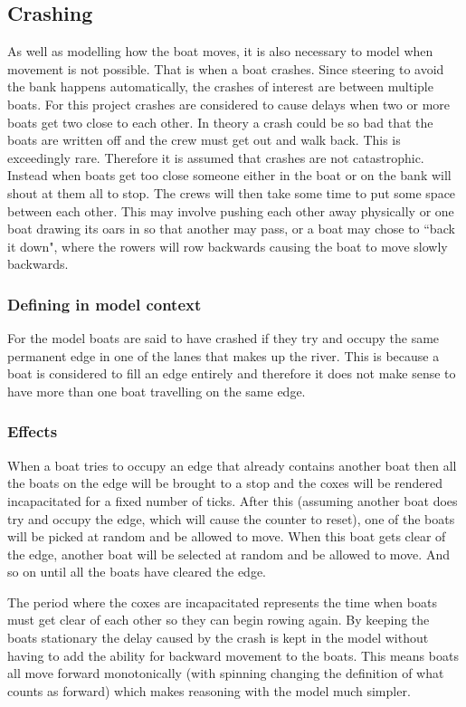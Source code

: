       \subsection{Crashing}\label{model:movement:crashing}
      As well as modelling how the boat moves, it is also necessary to model when movement is not possible. That is when a boat crashes. Since steering to avoid the bank happens automatically, the crashes of interest are between multiple boats. For this project crashes are considered to cause delays when two or more boats get two close to each other. In theory a crash could be so bad that the boats are written off and the crew must get out and walk back. This is exceedingly rare. Therefore it is assumed that crashes are not catastrophic. Instead when boats get too close someone either in the boat or on the bank will shout at them all to stop. The crews will then take some time to put some space between each other. This may involve pushing each other away physically or one boat drawing its oars in so that another may pass, or a boat may chose to ``back it down", where the rowers will row backwards causing the boat to move slowly backwards.
        
      \subsubsection{Defining in model context}
      For the model boats are said to have crashed if they try and occupy the same permanent edge in one of the lanes that makes up the river. This is because a boat is considered to fill an edge entirely and therefore it does not make sense to have more than one boat travelling on the same edge.

      \subsubsection{Effects}
      When a boat tries to occupy an edge that already contains another boat then all the boats on the edge will be brought to a stop and the coxes will be rendered incapacitated for a fixed number of ticks. After this (assuming another boat does try and occupy the edge, which will cause the counter to reset), one of the boats will be picked at random and be allowed to move. When this boat gets clear of the edge, another boat will be selected at random and be allowed to move. And so on until all the boats have cleared the edge.
      
      The period where the coxes are incapacitated represents the time when boats must get clear of each other so they can begin rowing again. By keeping the boats stationary the delay caused by the crash is kept in the model without having to add the ability for backward movement to the boats. This means boats all move forward monotonically (with spinning changing the definition of what counts as forward) which makes reasoning with the model much simpler.
      
